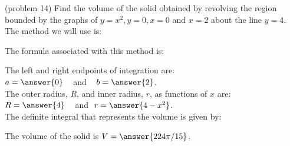 \documentclass{ximera}
\begin{document}
\begin{problem}(problem 14)
Find the volume of the solid obtained by revolving the region bounded by the graphs of $y = x^2, y = 0, x = 0$ and $x = 2$ about the line $y = 4$.\\
The method we will use is:
\begin{multipleChoice}
\end{multipleChoice}

The formula associated with this method is:
\begin{multipleChoice}
\end{multipleChoice}

The left and right endpoints of integration are:\\
$a = \answer{0}\;\;\;$ and $\;\;\; b = \answer{2}$.\\
The outer radius, $R$, and inner radius, $r$, as functions of $x$ are:\\
$R = \answer{4} \;\;\;$ and $\; r = \answer{4-x^2}$.\\

The definite integral that represents the volume is given by:\\
\begin{multipleChoice}
\end{multipleChoice}

The volume of the solid is $V = \answer{224\pi/15}$.

\end{problem}
\end{document}

